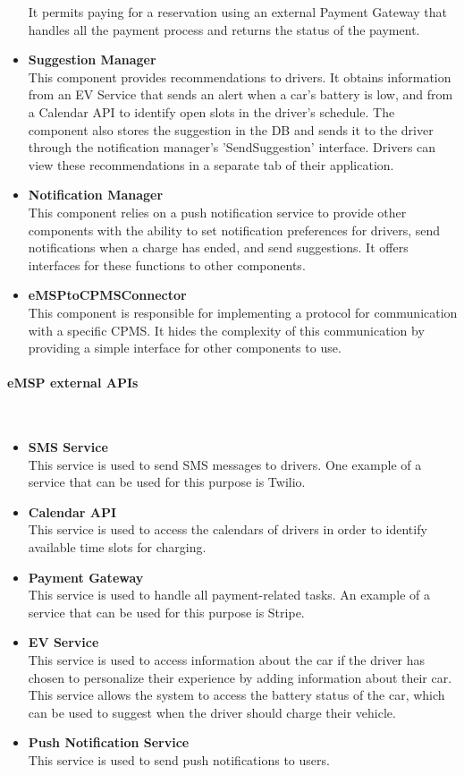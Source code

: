 \begin{itemize}
          It permits paying for a reservation using an external Payment Gateway that handles all the payment process and returns the status of the payment.
    \item \textbf{Suggestion Manager} \\ This component provides recommendations to drivers. It obtains information from an EV Service that sends an alert when a car's battery is low, and from a Calendar API to identify open slots in the driver's schedule. The component also stores the suggestion in the DB and sends it to the driver through the notification manager's 'SendSuggestion' interface. Drivers can view these recommendations in a separate tab of their application.
    \item \textbf{Notification Manager} \\ This component relies on a push notification service to provide other components with the ability to set notification preferences for drivers, send notifications when a charge has ended, and send suggestions. It offers interfaces for these functions to other components.
    \item \textbf{eMSPtoCPMSConnector} \\ This component is responsible for implementing a protocol for communication with a specific CPMS. It hides the complexity of this communication by providing a simple interface for other components to use.
\end{itemize}

\paragraph*{eMSP external APIs} \hfill \\
\begin{itemize}
    \item \textbf{SMS Service} \\ This service is used to send SMS messages to drivers. One example of a service that can be used for this purpose is Twilio.
    \item \textbf{Calendar API} \\ This service is used to access the calendars of drivers in order to identify available time slots for charging.
    \item \textbf{Payment Gateway} \\ This service is used to handle all payment-related tasks. An example of a service that can be used for this purpose is Stripe.
    \item \textbf{EV Service} \\ This service is used to access information about the car if the driver has chosen to personalize their experience by adding information about their car. This service allows the system to access the battery status of the car, which can be used to suggest when the driver should charge their vehicle.
    \item \textbf{Push Notification Service} \\ This service is used to send push notifications to users.
\end{itemize}

